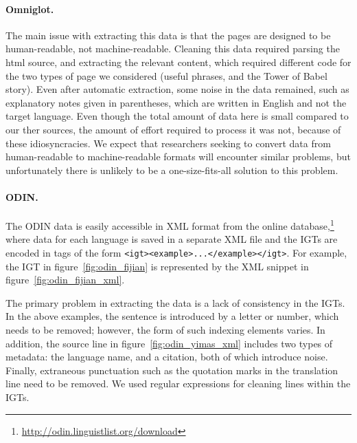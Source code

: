 \paragraph{Omniglot.}
The main issue with extracting this data is that the pages are designed to be human-readable, not machine-readable.  Cleaning this data required parsing the html source, and extracting the relevant content, which required different code for the two types of page we considered (useful phrases, and the Tower of Babel story).  Even after automatic extraction, some noise in the data remained, such as explanatory notes given in parentheses, which are written in English and not the target language.  Even though the total amount of data here is small compared to our ther sources, the amount of effort required to process it was not, because of these idiosyncracies.  We expect that researchers seeking to convert data from human-readable to machine-readable formats will encounter similar problems, but unfortunately there is unlikely to be a one-size-fits-all solution to this problem.


\paragraph{ODIN.}
The ODIN data is easily accessible in XML format from the online database,\footnote{\url{http://odin.linguistlist.org/download}} where data for each language is saved in a separate XML file and the IGTs are encoded in tags of the form \texttt{<igt><example>...</example></igt>}.  For example, the IGT in figure~\ref{fig:odin_fijian} is represented by the XML snippet in figure~\ref{fig:odin_fijian_xml}.




The primary problem in extracting the data is a lack of consistency in
the IGTs. In the above examples, the sentence is introduced by a
letter or number, which needs to be removed; however, the form of such
indexing elements varies. In addition, the source line in figure~\ref{fig:odin_yimas_xml}
includes two types of metadata: the language name, and a citation,
both of which introduce noise.  Finally, extraneous punctuation such
as the quotation marks in the translation line need to be removed. We used regular expressions for cleaning lines within the IGTs.


